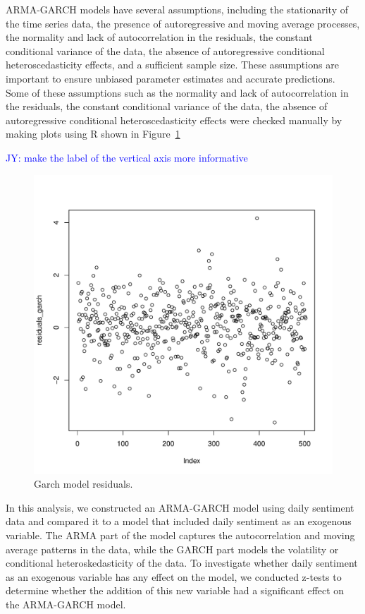 \documentclass[12pt, letterpaper, titlepage]{article}
\newcommand{\jy}[1]{\textcolor{blue}{JY: #1}}
\begin{document}
ARMA-GARCH models have several assumptions, including the stationarity of the time series data, the presence of autoregressive and moving average processes, the normality and lack of autocorrelation in the residuals, the constant conditional variance of the data, the absence of autoregressive conditional heteroscedasticity effects, and a sufficient sample size. These assumptions are important to ensure unbiased parameter estimates and accurate predictions. Some of these assumptions such as the normality and lack of autocorrelation in the residuals, the constant conditional variance of the data, the absence of autoregressive conditional heteroscedasticity effects were checked manually by making plots using R shown in Figure~\ref{fig:garchvar} 

\jy{make the label of the vertical axis more informative}
\begin{figure}[tbp]
  \begin{center}
  \includegraphics[width=\textwidth]{../figures/fig4.pdf}
  \caption{Garch model residuals.}\label{fig:garchvar}
  \end{center}
\end{figure}


In this analysis, we constructed an ARMA-GARCH model using daily sentiment data and compared it to a model that included daily sentiment as an exogenous variable. The ARMA part of the model captures the autocorrelation and moving average patterns in the data, while the GARCH part models the volatility or conditional heteroskedasticity of the data. To investigate whether daily sentiment as an exogenous variable has any effect on the model, we conducted z-tests to determine whether the addition of this new variable had a significant effect on the ARMA-GARCH model.
\end{document}
